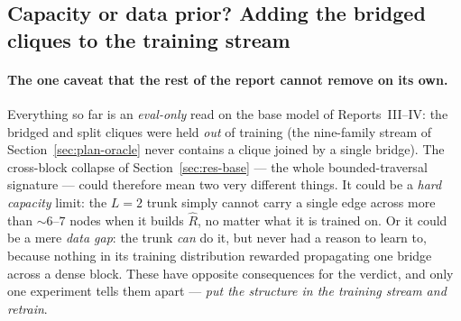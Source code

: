 \documentclass[11pt,a4paper]{article}
\begin{document}
\subsection{Capacity or data prior? Adding the bridged cliques to the training stream}
\label{sec:res-capacity}
\paragraph{The one caveat that the rest of the report cannot remove on its own.} Everything so far
is an \emph{eval-only} read on the base model of Reports~III--IV: the bridged and split cliques were
held \emph{out} of training (the nine-family stream of Section~\ref{sec:plan-oracle} never contains a
clique joined by a single bridge). The cross-block collapse of Section~\ref{sec:res-base} --- the
whole bounded-traversal signature --- could therefore mean two very different things. It could be a
\emph{hard capacity} limit: the $L=2$ trunk simply cannot carry a single edge across more than
$\sim6$--$7$ nodes when it builds $\hat R$, no matter what it is trained on. Or it could be a mere
\emph{data gap}: the trunk \emph{can} do it, but never had a reason to learn to, because nothing in
its training distribution rewarded propagating one bridge across a dense block. These have opposite
consequences for the verdict, and only one experiment tells them apart --- \emph{put the structure in
the training stream and retrain}.
\end{document}
